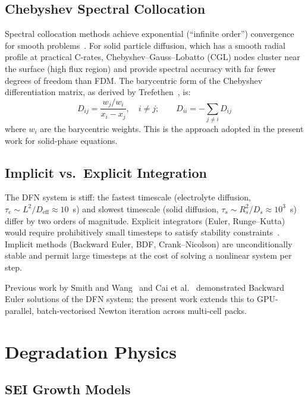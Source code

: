\subsection{Chebyshev Spectral Collocation}
\label{ssec:lit_chebyshev}

Spectral collocation methods achieve exponential (``infinite order'') convergence for smooth problems~\cite{Trefethen2000,Canuto2006}. For solid particle diffusion, which has a smooth radial profile at practical C-rates, Chebyshev--Gauss--Lobatto (CGL) nodes cluster near the surface (high flux region) and provide spectral accuracy with far fewer degrees of freedom than FDM. The barycentric form of the Chebyshev differentiation matrix, as derived by Trefethen~\cite{Trefethen2000}, is:
\begin{equation}
  D_{ij} = \frac{w_j / w_i}{x_i - x_j}, \quad i \neq j; \qquad D_{ii} = -\sum_{j \neq i} D_{ij}
  \label{eq:cheb_Dij}
\end{equation}
where $w_i$ are the barycentric weights. This is the approach adopted in the present work for solid-phase equations.

\subsection{Implicit vs.\ Explicit Integration}
\label{ssec:lit_implicit}

The DFN system is stiff: the fastest timescale (electrolyte diffusion, $\tau_e \sim L^2/D_\text{eff} \approx 10$~s) and slowest timescale (solid diffusion, $\tau_s \sim R_s^2/D_s \approx 10^3$~s) differ by two orders of magnitude. Explicit integrators (Euler, Runge--Kutta) would require prohibitively small timesteps to satisfy stability constraints~\cite{Hairer1993}. Implicit methods (Backward Euler, BDF, Crank--Nicolson) are unconditionally stable and permit large timesteps at the cost of solving a nonlinear system per step.

Previous work by Smith and Wang~\cite{Smith2006} and Cai et al.~\cite{Cai2011} demonstrated Backward Euler solutions of the DFN system; the present work extends this to GPU-parallel, batch-vectorised Newton iteration across multi-cell packs.

\section{Degradation Physics}
\label{sec:lit_degradation}

\subsection{SEI Growth Models}
\label{ssec:lit_sei_models}

